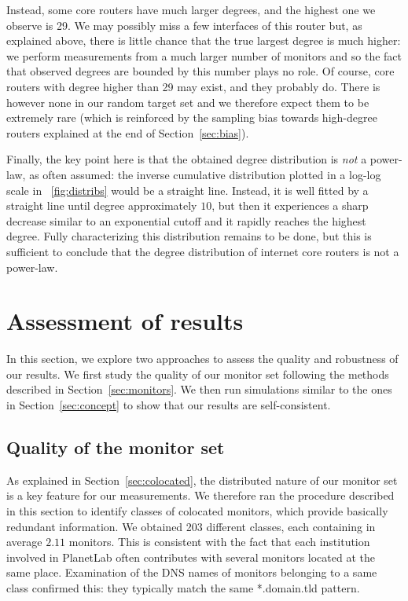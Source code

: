 \documentclass[conference]{IEEEtran}
\newcommand{\noteperso}[1]{\begin{center}
\fbox{\begin{minipage}{0.9\columnwidth}#1\end{minipage}}\end{center}}
\begin{document}
Instead, some core routers have much larger degrees, and the highest one we observe is 29. We may possibly miss a few interfaces of this router but, as explained above, there is little chance that the true largest degree is much higher: we perform measurements from a much larger number of monitors and so the fact that observed degrees are bounded by this number plays no role. Of course, core routers with degree higher than 29 may exist, and they probably do. There is however none in our random target set and we therefore expect them to be extremely rare (which is reinforced by the sampling bias towards high-degree routers explained at the end of Section~\ref{sec:bias}).

Finally, the key point here is that the obtained degree distribution is {\em not} a power-law, as often assumed: the inverse cumulative distribution plotted in a log-log scale in \figurename~\ref{fig:distribs} would be a straight line. Instead, it is well fitted by a straight line until degree approximately $10$, but then it experiences a sharp decrease similar to an exponential cutoff and it rapidly reaches the highest degree. Fully characterizing this distribution remains to be done, but this is sufficient to conclude that the degree distribution of internet core routers is not a power-law.

\section{Assessment of results}
\label{sec:assessment}

In this section, we explore two approaches to assess the quality and robustness of our results. We first study the quality of our monitor set following the methods described in Section~\ref{sec:monitors}. We then run simulations similar to the ones in Section~\ref{sec:concept} to show that our results are self-consistent.

\subsection{Quality of the monitor set}
\label{sec:results-monitors-assessment}


As explained in Section~\ref{sec:colocated}, the distributed nature of our monitor set is a key feature for our measurements. We therefore ran the procedure described in this section to identify classes of colocated monitors, which provide basically redundant information. We obtained 203 different classes, each containing in average $2.11$ monitors. This is consistent with the fact that each institution involved in PlanetLab often contributes with several monitors located at the same place. Examination of the DNS names of monitors belonging to a same class confirmed this: they typically match the same *.domain.tld pattern.
\end{document}

